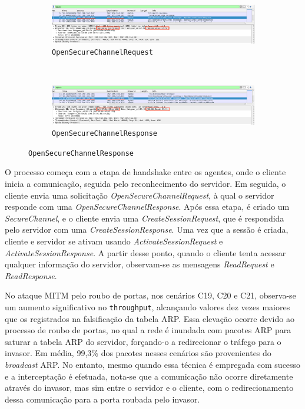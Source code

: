         \begin{figure}[htbp!]
            \centering
            \caption{\label{fig:0-mitm-wireshark}Interceptação de pacotes no ataque MITM com modo de segurança `None'}
            \begin{subfigure}[t]{1\textwidth}
                \centering
                \caption{\texttt{OpenSecureChannelRequest}}
                \includegraphics[width=1\textwidth]{USPSC-img/0-mitm-arp_1.png}
            \end{subfigure}%
            \\
            \begin{subfigure}[t]{1\textwidth}
                \centering
                \caption{\texttt{OpenSecureChannelResponse}}
                \includegraphics[width=1\textwidth]{USPSC-img/0-mitm-arp_2.png}
            \end{subfigure}%
        \end{figure}

        O processo começa com a etapa de handshake entre os agentes, onde o cliente inicia a comunicação, seguida pelo reconhecimento do servidor. Em seguida, o cliente envia uma solicitação \textit{OpenSecureChannelRequest}, à qual o servidor responde com uma \textit{OpenSecureChannelResponse}. Após essa etapa, é criado um \textit{SecureChannel}, e o cliente envia uma \textit{CreateSessionRequest}, que é respondida pelo servidor com uma \textit{CreateSessionResponse}. Uma vez que a sessão é criada, cliente e servidor se ativam usando \textit{ActivateSessionRequest} e \textit{ActivateSessionResponse}. A partir desse ponto, quando o cliente tenta acessar qualquer informação do servidor, observam-se as mensagens \textit{ReadRequest} e \textit{ReadResponse}.

        No ataque MITM pelo roubo de portas, nos cenários C19, C20 e C21, observa-se um aumento significativo no \texttt{throughput}, alcançando valores dez vezes maiores que os registrados na falsificação da tabela ARP. Essa elevação ocorre devido ao processo de roubo de portas, no qual a rede é inundada com pacotes ARP para saturar a tabela ARP do servidor, forçando-o a redirecionar o tráfego para o invasor. Em média, 99,3\% dos pacotes nesses cenários são provenientes do \textit{broadcast} ARP. No entanto, mesmo quando essa técnica é empregada com sucesso e a interceptação é efetuada, nota-se que a comunicação não ocorre diretamente através do invasor, mas sim entre o servidor e o cliente, com o redirecionamento dessa comunicação para a porta roubada pelo invasor.
        
